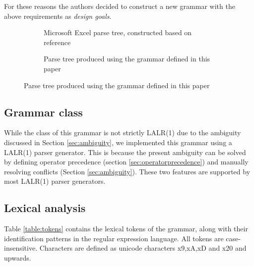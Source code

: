 \documentclass[conference]{IEEEtran}
\begin{document}
For these reasons the authors decided to construct a new grammar with the above requirements as \emph{design goals}.

\begin{figure}
	\caption{Parse trees for formula \texttt{SUM(B2,5)}}
	\centering
	\begin{subfigure}[b]{0.3\textwidth}
		\caption{Microsoft Excel parse tree, constructed based on reference \cite{ExcelOfficialGrammar}}
		\hspace{-2em}
		\scalebox{.7}{
			
		}
	\end{subfigure}
	\begin{subfigure}[b]{0.3\textwidth}
		\vspace{1em}
		\hspace{-0.5em}
		\caption{Parse tree produced using the grammar defined in this paper}
		\scalebox{.7}{
			
		}
	\end{subfigure}
	\label{figure:parsetrees}
\end{figure}

\subsection{Grammar class}

While the class of this grammar is not strictly LALR(1) due to the ambiguity discussed in Section \ref{sec:ambiguity}, we implemented this grammar using a LALR(1) parser generator.
This is because the present ambiguity can be solved by defining operator precedence (section \ref{sec:operatorprecedence}) and manually resolving conflicts (Section \ref{sec:ambiguity}).
These two features are supported by most LALR(1) parser generators.
\begin{table}
\caption{Lexical tokens used in the grammar}
\label{table:tokens}

\end{table}

\subsection{Lexical analysis}
Table \ref{table:tokens} contains the lexical tokens of the grammar, along with their identification patterns in the regular expression language. All tokens are case-insensitive.
Characters are defined as unicode characters x9,xA,xD and x20 and upwards.
\end{document}
